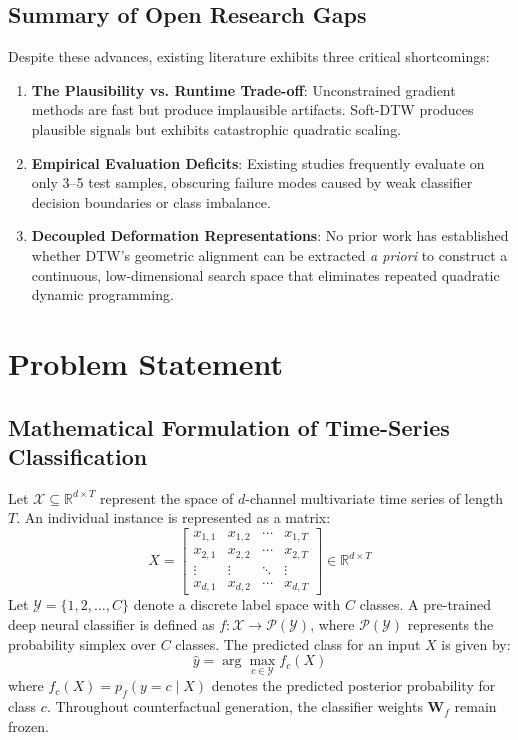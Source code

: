 \documentclass[11pt,a4paper]{report}
\begin{document}
\section{Summary of Open Research Gaps}
Despite these advances, existing literature exhibits three critical shortcomings:
\begin{enumerate}
    \item \textbf{The Plausibility vs. Runtime Trade-off}: Unconstrained gradient methods are fast but produce implausible artifacts. Soft-DTW produces plausible signals but exhibits catastrophic quadratic scaling.
    \item \textbf{Empirical Evaluation Deficits}: Existing studies frequently evaluate on only 3–5 test samples, obscuring failure modes caused by weak classifier decision boundaries or class imbalance.
    \item \textbf{Decoupled Deformation Representations}: No prior work has established whether DTW's geometric alignment can be extracted \textit{a priori} to construct a continuous, low-dimensional search space that eliminates repeated quadratic dynamic programming.
\end{enumerate}

\chapter{Problem Statement}

\section{Mathematical Formulation of Time-Series Classification}
Let $\mathcal{X} \subseteq \mathbb{R}^{d \times T}$ represent the space of $d$-channel multivariate time series of length $T$. An individual instance is represented as a matrix:
\begin{equation}
    X = \begin{bmatrix} x_{1,1} & x_{1,2} & \cdots & x_{1,T} \\ x_{2,1} & x_{2,2} & \cdots & x_{2,T} \\ \vdots & \vdots & \ddots & \vdots \\ x_{d,1} & x_{d,2} & \cdots & x_{d,T} \end{bmatrix} \in \mathbb{R}^{d \times T}
\end{equation}
Let $\mathcal{Y} = \{1, 2, \dots, C\}$ denote a discrete label space with $C$ classes. A pre-trained deep neural classifier is defined as $f: \mathcal{X} \rightarrow \mathcal{P}(\mathcal{Y})$, where $\mathcal{P}(\mathcal{Y})$ represents the probability simplex over $C$ classes. The predicted class for an input $X$ is given by:
\begin{equation}
    \hat{y} = \arg\max_{c \in \mathcal{Y}} f_c(X)
\end{equation}
where $f_c(X) = p_f(y=c \mid X)$ denotes the predicted posterior probability for class $c$. Throughout counterfactual generation, the classifier weights $\mathbf{W}_f$ remain frozen.
\end{document}
